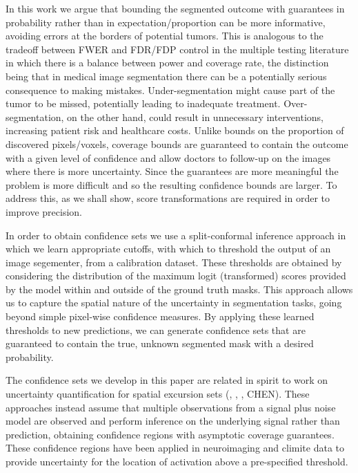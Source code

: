 In this work we argue that bounding the segmented outcome with guarantees in probability rather than in expectation/proportion can be more informative, avoiding errors at the borders of potential tumors. This is analogous to the tradeoff between FWER and FDR/FDP control in the multiple testing literature in which there is a balance between power and coverage rate, the distinction being that in medical image segmentation there can be a potentially serious consequence to making mistakes. Under-segmentation might cause part of the tumor to be missed, potentially leading to inadequate treatment. Over-segmentation, on the other hand, could result in unnecessary interventions, increasing patient risk and healthcare costs. Unlike bounds on the proportion of discovered pixels/voxels, coverage bounds are guaranteed to contain the outcome with a given level of confidence and allow doctors to follow-up on the images where there is more uncertainty. Since the guarantees are more meaningful the problem is more difficult and so the resulting confidence bounds are larger. To address this, as we shall show, score transformations are required in order to improve precision. 

In order to obtain confidence sets we use a split-conformal inference approach in which we learn appropriate cutoffs, with which to threshold the output of an image segementer, from a calibration dataset. These thresholds are obtained by considering the distribution of the maximum logit (transformed) scores provided by the model within and outside of the ground truth masks. This approach allows us to capture the spatial nature of the uncertainty in segmentation tasks, going beyond simple pixel-wise confidence measures. By applying these learned thresholds to new predictions, we can generate confidence sets that are guaranteed to contain the true, unknown segmented mask with a desired probability. 

The confidence sets we develop in this paper are related in spirit to work on uncertainty quantification for spatial excursion sets (\cite{Sommerfield2018}, \cite{Telschow2023scope}, \cite{Mejia2019}, CHEN). These approaches instead assume that multiple observations from a signal plus noise model are observed and perform inference on the underlying signal rather than prediction, obtaining confidence regions with asymptotic coverage guarantees. These confidence regions have been applied in neuroimaging \citep{Bowring2019, Bowring2020} and climite data \cite{Ren} to provide uncertainty for the location of activation above a pre-specified threshold. 


